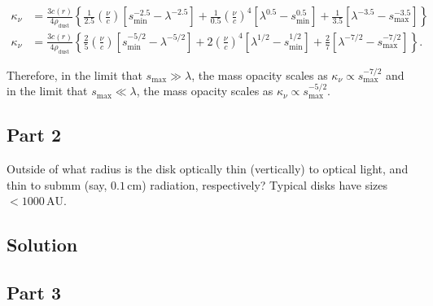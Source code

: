 \documentclass[12pt]{article}
\begin{document}
\begin{equation*}
\begin{split}
\kappa_\nu &= \frac{3c(r)}{4\rho_\mathrm{dust}} \left\{\frac{1}{2.5}\left(\frac{\nu}{c}\right) \left[s_\mathrm{min}^{-2.5} - \lambda^{-2.5}\right] + \frac{1}{0.5}\left(\frac{\nu}{c}\right)^4 \left[\lambda^{0.5} - s_\mathrm{min}^{0.5}\right] + \frac{1}{3.5}\left[\lambda^{-3.5} - s_\mathrm{max}^{-3.5}\right] \right\} \\
\kappa_\nu &= \frac{3c(r)}{4\rho_\mathrm{dust}} \left\{\frac{2}{5}\left(\frac{\nu}{c}\right) \left[s_\mathrm{min}^{-5/2} - \lambda^{-5/2}\right] + 2\left(\frac{\nu}{c}\right)^4 \left[\lambda^{1/2} - s_\mathrm{min}^{1/2}\right] + \frac{2}{7}\left[\lambda^{-7/2} - s_\mathrm{max}^{-7/2}\right] \right\}.
\end{split}
\end{equation*}

Therefore, in the limit that $s_\mathrm{max}\gg\lambda$, the mass opacity scales as $\kappa_\nu \propto s_\mathrm{max}^{-7/2}$ and in the limit that $s_\mathrm{max}\ll\lambda$, the mass opacity scales as $\kappa_\nu \propto s_\mathrm{max}^{-5/2}$.


\subsection*{Part 2}

Outside of what radius is the disk optically thin (vertically) to optical light, and thin to submm (say, $0.1\,\mathrm{cm}$) radiation, respectively? Typical disks have sizes $<1000\,\mathrm{AU}$.


\subsection*{Solution}




\subsection*{Part 3}
\end{document}
